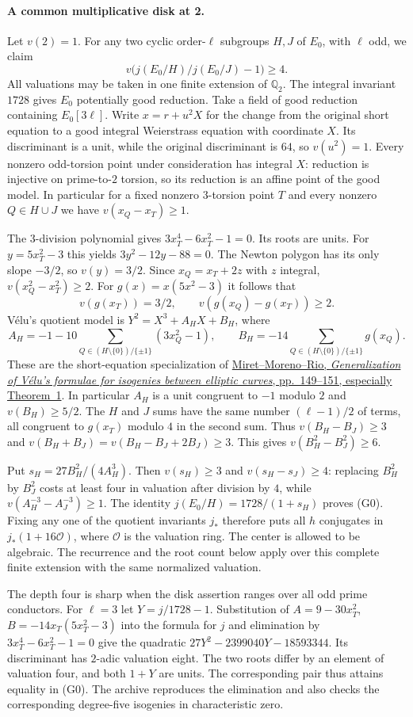 \paragraph{A common multiplicative disk at 2.}
Let $v(2)=1$. For any two cyclic order-$\ell$ subgroups $H,J$ of
$E_0$, with $\ell$ odd, we claim
\[
 v\big(j(E_0/H)/j(E_0/J)-1\big)\ge4.                 \tag{G0}
\]
All valuations may be taken in one finite extension of $\mathbb Q_2$.
The integral invariant $1728$ gives $E_0$ potentially good reduction.
Take a field of good reduction containing $E_0[3\ell]$. Write
$x=r+u^2X$ for the change from the original short equation to a good
integral Weierstrass equation with coordinate $X$. Its discriminant
is a unit, while the original discriminant is $64$, so $v(u^2)=1$.
Every nonzero odd-torsion point under consideration has integral $X$:
reduction is injective on prime-to-$2$ torsion, so its reduction is
an affine point of the good model. In particular for a fixed
nonzero $3$-torsion point $T$ and every nonzero $Q\in H\cup J$ we
have $v(x_Q-x_T)\ge1$.

The $3$-division polynomial gives $3x_T^4-6x_T^2-1=0$.
Its roots are units. For $y=5x_T^2-3$ this yields
$3y^2-12y-88=0$. The Newton polygon has its only slope $-3/2$,
so $v(y)=3/2$. Since $x_Q=x_T+2z$ with $z$ integral,
$v(x_Q^2-x_T^2)\ge2$. For $g(x)=x(5x^2-3)$ it follows that
\[
 v(g(x_T))=3/2,\qquad v(g(x_Q)-g(x_T))\ge2.
\]
V\'elu's quotient model is $Y^2=X^3+A_H X+B_H$, where
\[
 A_H=-1-10\!\sum_{Q\in(H\setminus\{0\})/\{\pm1\}}(3x_Q^2-1),
 \qquad
 B_H=-14\!\sum_{Q\in(H\setminus\{0\})/\{\pm1\}}g(x_Q).
\]
These are the short-equation specialization of
\href{https://ddd.uab.cat/pub/pubmat/pubmat_a2007vEXTRA/pubmat_a2007vextrap147.pdf}{Miret--Moreno--Rio,
\emph{Generalization of V\'elu's formulae for isogenies between elliptic curves},
pp.~149--151, especially Theorem~1}.
In particular $A_H$ is a unit congruent to $-1$ modulo $2$ and
$v(B_H)\ge5/2$. The $H$ and $J$ sums have the same number
$(\ell-1)/2$ of terms, all congruent to $g(x_T)$ modulo $4$ in
the second sum. Thus $v(B_H-B_J)\ge3$ and
$v(B_H+B_J)=v(B_H-B_J+2B_J)\ge3$.
This gives $v(B_H^2-B_J^2)\ge6$.

Put $s_H=27B_H^2/(4A_H^3)$. Then $v(s_H)\ge3$ and
$v(s_H-s_J)\ge4$: replacing $B_H^2$ by $B_J^2$ costs at least four
in valuation after division by $4$, while
$v(A_H^{-3}-A_J^{-3})\ge1$. The identity
$j(E_0/H)=1728/(1+s_H)$ proves (G0).
Fixing any one of the quotient invariants $j_*$ therefore puts all
$h$ conjugates in $j_*(1+16\mathcal O)$, where $\mathcal O$ is the
valuation ring. The center is allowed to be algebraic. The recurrence
and the root count below apply over this complete finite extension
with the same normalized valuation.

The depth four is sharp when the disk assertion ranges over all odd
prime conductors. For $\ell=3$ let $Y=j/1728-1$. Substitution of
$A=9-30x_T^2$, $B=-14x_T(5x_T^2-3)$ into the formula for $j$
and elimination by $3x_T^4-6x_T^2-1=0$ give the quadratic
$27Y^2-2399040Y-18593344$. Its discriminant has $2$-adic valuation
eight. The two roots differ by an element of valuation four, and
both $1+Y$ are units. The corresponding pair thus attains equality
in (G0). The archive reproduces the elimination and also checks
the corresponding degree-five isogenies in characteristic zero.
